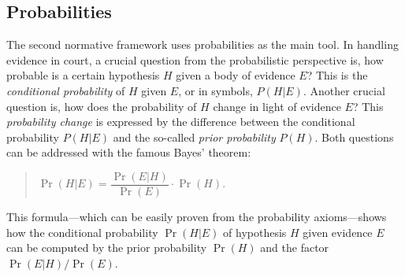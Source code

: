 \documentclass[10pt]{article}
\begin{document}
\subsection{Probabilities}
\label{sec:normfram:prob}
The second normative framework %
uses probabilities as the main tool. 
In handling evidence in court, a crucial question from the probabilistic perspective is, 
how probable is a certain hypothesis $H$ given a body of evidence $E$? This is 
the \textit{conditional probability} of $H$ given $E$, or in symbols, $P(H|E)$. 
Another crucial question is, how does the probability of $H$ 
change in light of evidence $E$? This \textit{probability change} is expressed by 
the difference between the conditional probability $P(H|E)$ and the so-called \textit{prior 
probability} $P(H)$.
Both questions can be addressed with 
the famous Bayes' theorem:
%
\begin{quotation}
	$\Pr(H|E) = \dfrac{\Pr(E|H)}{\Pr(E)}\cdot\Pr(H)$.
\end{quotation}
%
This formula---which can be easily proven from 
the probability axioms---shows how the 
conditional probability $\Pr(H|E)$ of hypothesis $H$ given evidence $E$ 
can be computed by the prior probability $\Pr(H)$ and the 
factor $\Pr(E|H)/\Pr(E)$.  
\end{document}

